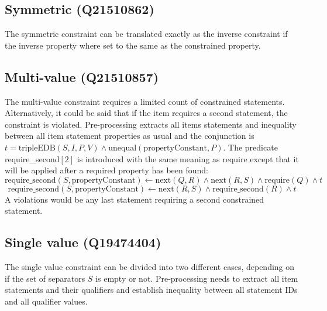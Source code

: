 \documentclass[hyperref,bachelorofscience,fleqn]{cgvpub}
\begin{document}
\subsection{Symmetric (Q21510862)}
The symmetric constraint can be translated exactly as the inverse constraint if the inverse property where set to the same as the constrained property.

\subsection{Multi-value (Q21510857)}
The multi-value constraint requires a limited count of constrained statements. Alternatively, it could be said that if the item requires a second statement, the constraint is violated. Pre-processing extracts all items statements and inequality between all item statement properties as usual and the conjunction is \(t = \text{tripleEDB}(S, I, P, V) \wedge \text{unequal}(\text{propertyConstant}, P)\). The predicate require\_second\([2]\) is introduced with the same meaning as require except that it will be applied after a required property has been found:
\begin{equation*}
\text{require\_second}(S, \text{propertyConstant}) \leftarrow \text{next}(Q, R) \wedge \text{next}(R, S) \wedge \text{require}(Q) \wedge t
\end{equation*}
\begin{equation*}
\text{require\_second}(S, \text{propertyConstant}) \leftarrow \text{next}(R, S) \wedge \text{require\_second}(R) \wedge t
\end{equation*}
A violations would be any last statement requiring a second constrained statement.

\subsection{Single value (Q19474404)}\label{subsec_3_single_value}
The single value constraint can be divided into two different cases, depending on if the set of separators \(S\) is empty or not. Pre-processing needs to extract all item statements and their qualifiers and establish inequality between all statement IDs and all qualifier values.
\end{document}
